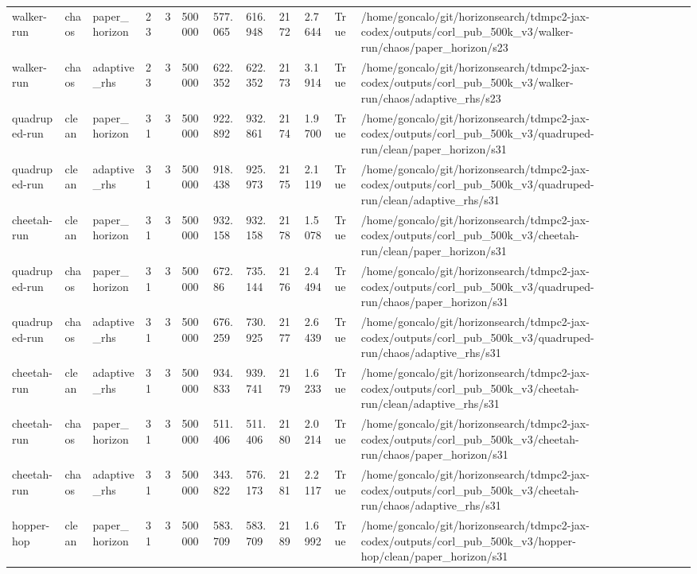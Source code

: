 \begin{tabular}{llllllllllll}
walker-run & chaos & paper\_horizon & 23 & 3 & 500000 & 577.065 & 616.948 & 2172 & 2.7644 & True & /home/goncalo/git/horizonsearch/tdmpc2-jax-codex/outputs/corl\_pub\_500k\_v3/walker-run/chaos/paper\_horizon/s23 \\
walker-run & chaos & adaptive\_rhs & 23 & 3 & 500000 & 622.352 & 622.352 & 2173 & 3.1914 & True & /home/goncalo/git/horizonsearch/tdmpc2-jax-codex/outputs/corl\_pub\_500k\_v3/walker-run/chaos/adaptive\_rhs/s23 \\
quadruped-run & clean & paper\_horizon & 31 & 3 & 500000 & 922.892 & 932.861 & 2174 & 1.9700 & True & /home/goncalo/git/horizonsearch/tdmpc2-jax-codex/outputs/corl\_pub\_500k\_v3/quadruped-run/clean/paper\_horizon/s31 \\
quadruped-run & clean & adaptive\_rhs & 31 & 3 & 500000 & 918.438 & 925.973 & 2175 & 2.1119 & True & /home/goncalo/git/horizonsearch/tdmpc2-jax-codex/outputs/corl\_pub\_500k\_v3/quadruped-run/clean/adaptive\_rhs/s31 \\
cheetah-run & clean & paper\_horizon & 31 & 3 & 500000 & 932.158 & 932.158 & 2178 & 1.5078 & True & /home/goncalo/git/horizonsearch/tdmpc2-jax-codex/outputs/corl\_pub\_500k\_v3/cheetah-run/clean/paper\_horizon/s31 \\
quadruped-run & chaos & paper\_horizon & 31 & 3 & 500000 & 672.86 & 735.144 & 2176 & 2.4494 & True & /home/goncalo/git/horizonsearch/tdmpc2-jax-codex/outputs/corl\_pub\_500k\_v3/quadruped-run/chaos/paper\_horizon/s31 \\
quadruped-run & chaos & adaptive\_rhs & 31 & 3 & 500000 & 676.259 & 730.925 & 2177 & 2.6439 & True & /home/goncalo/git/horizonsearch/tdmpc2-jax-codex/outputs/corl\_pub\_500k\_v3/quadruped-run/chaos/adaptive\_rhs/s31 \\
cheetah-run & clean & adaptive\_rhs & 31 & 3 & 500000 & 934.833 & 939.741 & 2179 & 1.6233 & True & /home/goncalo/git/horizonsearch/tdmpc2-jax-codex/outputs/corl\_pub\_500k\_v3/cheetah-run/clean/adaptive\_rhs/s31 \\
cheetah-run & chaos & paper\_horizon & 31 & 3 & 500000 & 511.406 & 511.406 & 2180 & 2.0214 & True & /home/goncalo/git/horizonsearch/tdmpc2-jax-codex/outputs/corl\_pub\_500k\_v3/cheetah-run/chaos/paper\_horizon/s31 \\
cheetah-run & chaos & adaptive\_rhs & 31 & 3 & 500000 & 343.822 & 576.173 & 2181 & 2.2117 & True & /home/goncalo/git/horizonsearch/tdmpc2-jax-codex/outputs/corl\_pub\_500k\_v3/cheetah-run/chaos/adaptive\_rhs/s31 \\
hopper-hop & clean & paper\_horizon & 31 & 3 & 500000 & 583.709 & 583.709 & 2189 & 1.6992 & True & /home/goncalo/git/horizonsearch/tdmpc2-jax-codex/outputs/corl\_pub\_500k\_v3/hopper-hop/clean/paper\_horizon/s31 \\

\end{tabular}
